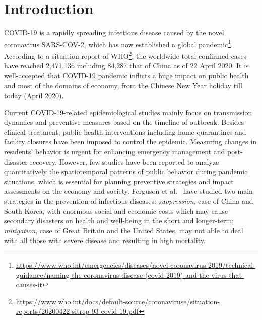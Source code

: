 \documentclass[ijgi,submit,moreauthors,pdftex]{Definitions/mdpi}
\begin{document}
\section{Introduction}
COVID-19 is a rapidly spreading infectious disease caused by the novel coronavirus SARS-COV-2, which has now established a global pandemic\footnote{\url{https://www.who.int/emergencies/diseases/novel-coronavirus-2019/technical-guidance/naming-the-coronavirus-disease-(covid-2019)-and-the-virus-that-causes-it}}.
According to a situation report of WHO\footnote{\url{https://www.who.int/docs/default-source/coronaviruse/situation-reports/20200422-sitrep-93-covid-19.pdf}}, the worldwide total confirmed cases have reached 2,471,136 including 84,287 that of China as of 22 April 2020.
It is well-accepted that COVID-19 pandemic inflicts a huge impact on public health and most of the domains of economy, from the Chinese New Year holiday till today (April 2020).

Current COVID-19-related epidemiological studies mainly focus on transmission dynamics \cite{li2020early,pitzer2009demographic} and preventive measures \cite{chinazzi2020effect,van2006today} based on the timeline of outbreak.
Besides clinical treatment, public health interventions including home quarantines and facility closures have been imposed to control the epidemic.
Measuring changes in residents' behavior is urgent for enhancing emergency management and post-disaster recovery.
However, few studies have been reported to analyze quantitatively the spatiotemporal patterns of public behavior during pandemic situations, which is essential for planning preventive strategies and impact assessments on the economy and society.
Ferguson et al.\ \cite{ferguson2020report} have studied two main strategies in the prevention of infectious diseases: \textit{suppression}, case of China and South Korea, with enormous social and economic costs which may cause secondary disasters on health and well-being in the short and longer-term;
\textit{mitigation}, case of Great Britain and the United States, may not able to deal with all those with severe disease and resulting in high mortality.
\end{document}
